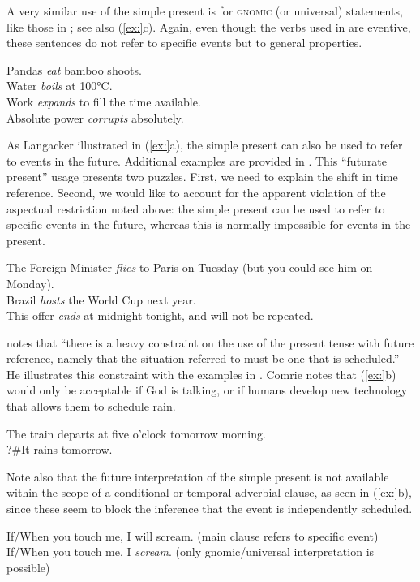 A very similar use of the simple present is for \textsc{gnomic} (or universal) statements, like those in ; see also (\ref{ex:}c). Again, even though the verbs used in  are eventive, these sentences do not refer to specific events but to general properties.


\ea
\ea Pandas \textit{eat} bamboo shoots.\\
\ex Water \textit{boils} at 100°C.\\
\ex Work \textit{expands} to fill the time available.\\
\ex Absolute power \textit{corrupts} absolutely.
                       \z
\z

As Langacker illustrated in (\ref{ex:}a), the simple present can also be used to refer to events in the future. Additional examples are provided in . This “futurate present” usage presents two puzzles. First, we need to explain the shift in time reference. Second, we would like to account for the apparent violation of the aspectual restriction noted above: the simple present can be used to refer to specific events in the future, whereas this is normally impossible for events in the present.

\ea
\ea The Foreign Minister \textit{flies} to Paris on Tuesday (but you could see him on Monday).\\
\ex Brazil \textit{hosts} the World Cup next year.\\
\ex This offer \textit{ends} at midnight tonight, and will not be repeated.
                       \z
\z

\citet[47]{Comrie1976} notes that “there is a heavy constraint on the use of the present tense with future reference, namely that the situation referred to must be one that is scheduled.” He illustrates this constraint with the examples in . Comrie notes that (\ref{ex:}b) would only be acceptable if God is talking, or if humans develop new technology that allows them to schedule rain.

\ea
\ea The train departs at five o’clock tomorrow morning.\\
\ex ?\#It rains tomorrow.
                       \z
\z

Note also that the future interpretation of the simple present is not available within the scope of a conditional or temporal adverbial clause, as seen in (\ref{ex:}b), since these seem to block the inference that the event is independently scheduled.

\ea
\ea If/When you touch me, I will scream.  (main clause refers to specific event)\\
\ex If/When you touch me, I \textit{scream}.  (only gnomic/universal interpretation is possible)
                       \z
\z


